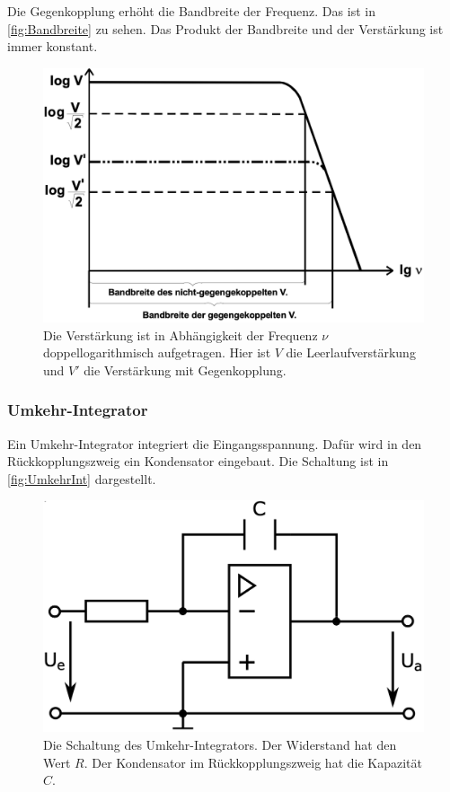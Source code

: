 Die Gegenkopplung erhöht die Bandbreite der Frequenz. Das ist in \autoref{fig:Bandbreite} zu sehen. Das Produkt der Bandbreite und der Verstärkung ist immer konstant.

\begin{figure}
    \centering
    \includegraphics[width=0.7\linewidth]{./figures/Bandbreite.png}
    \caption{Die Verstärkung ist in Abhängigkeit der Frequenz $\nu$ doppellogarithmisch aufgetragen. Hier ist $V$ die Leerlaufverstärkung und $V'$ die Verstärkung mit Gegenkopplung. \cite{V51old}}
    \label{fig:Bandbreite}
\end{figure}


\subsubsection{Umkehr-Integrator}
Ein Umkehr-Integrator integriert die Eingangsspannung.
Dafür wird in den Rückkopplungszweig ein Kondensator eingebaut. Die Schaltung ist in \autoref{fig:UmkehrInt} dargestellt.

\begin{figure}
    \centering
    \includegraphics[width=0.7\linewidth]{./figures/2_Umkehr.png}
    \caption{Die Schaltung des Umkehr-Integrators. Der Widerstand hat den Wert $R$. Der Kondensator im Rückkopplungszweig hat die Kapazität $C$. \cite{V51}}
    \label{fig:UmkehrInt}
\end{figure}
\FloatBarrier

